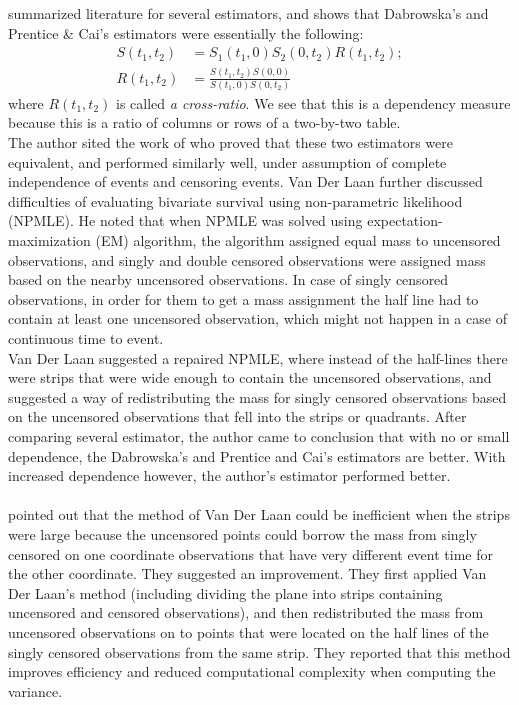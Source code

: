 \documentclass[]{article}
\begin{document}
\cite{van1997nonparametric} summarized literature for several estimators, and shows that Dabrowska's and Prentice \& Cai's estimators were essentially the following:
	$$
	\begin{aligned}
    S(t_1, t_2) &= S_1(t_1, 0)S_2(0, t_2)R(t_1, t_2);\\
		R(t_1, t_2) &= \frac{S(t_1, t_2)S(0, 0)}{S(t_1,0)S(0,t_2)}
 	\end{aligned}
	$$
where $R(t_1, t_2)$ is called \emph{a cross-ratio}. We see that this is a dependency measure because this is a ratio of columns or rows of a two-by-two table.\\
The author sited the work of \cite{gill1990survey} who proved that these two estimators were equivalent, and performed similarly well, under assumption of complete independence of events and censoring events.
Van Der Laan further discussed difficulties of evaluating bivariate survival using non-parametric likelihood (NPMLE).
He noted that when NPMLE was solved using expectation-maximization (EM) algorithm, the algorithm assigned equal mass to uncensored observations, and singly and double censored observations were assigned mass based on the nearby uncensored observations. In case of singly censored observations, in order for them to get a mass assignment the half line had to contain at least one uncensored observation, which might not happen in a case of continuous time to event.\\
Van Der Laan suggested a repaired NPMLE, where instead of the half-lines there were strips that were wide enough to contain the uncensored observations, and suggested a way of redistributing the mass for singly censored observations based on the uncensored observations that fell into the strips or quadrants.
After comparing several estimator, the author came to conclusion that with no or small dependence, the Dabrowska's and Prentice and Cai's estimators are better. With increased dependence however, the author's estimator performed better.\\
~\\

\cite{moodie2005adjustment} pointed out that the method of Van Der Laan could be inefficient when the strips were large because the uncensored points could borrow the mass from singly censored on one coordinate observations that have very different event time for the other coordinate. They suggested an improvement. They first applied Van Der Laan's method (including dividing the plane into strips containing uncensored and censored observations), and then redistributed the mass from uncensored observations on to points that were located on the half lines of the singly censored observations from the same strip. They reported that this method improves efficiency and reduced computational complexity when computing the variance.\\
\end{document}
